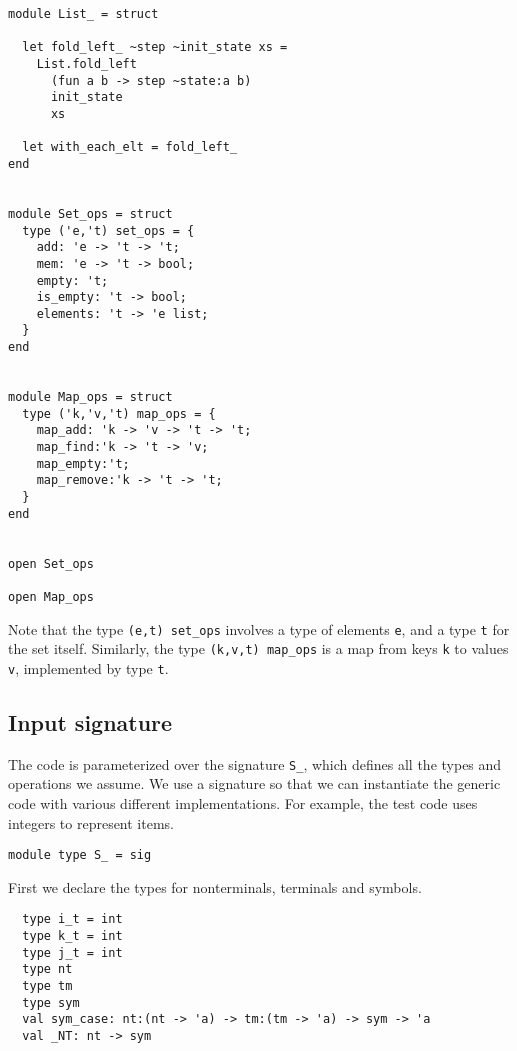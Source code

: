 \documentclass[]{article}
\begin{document}
\begin{multicols}{2}
\begin{verbatim}
module List_ = struct

  let fold_left_ ~step ~init_state xs = 
    List.fold_left 
      (fun a b -> step ~state:a b)
      init_state
      xs

  let with_each_elt = fold_left_
end


module Set_ops = struct
  type ('e,'t) set_ops = {
    add: 'e -> 't -> 't;
    mem: 'e -> 't -> bool;
    empty: 't;
    is_empty: 't -> bool;
    elements: 't -> 'e list;
  }
end


module Map_ops = struct
  type ('k,'v,'t) map_ops = {
    map_add: 'k -> 'v -> 't -> 't;
    map_find:'k -> 't -> 'v;
    map_empty:'t;
    map_remove:'k -> 't -> 't;
  }
end


open Set_ops

open Map_ops

\end{verbatim}

Note that the type
\texttt{(\textquotesingle{}e,\textquotesingle{}t) set\_ops} involves a
type of elements \texttt{\textquotesingle{}e}, and a type
\texttt{\textquotesingle{}t} for the set itself. Similarly, the type
\texttt{(\textquotesingle{}k,\textquotesingle{}v,\textquotesingle{}t) map\_ops}
is a map from keys \texttt{\textquotesingle{}k} to values
\texttt{\textquotesingle{}v}, implemented by type
\texttt{\textquotesingle{}t}.

\subsection{Input signature}

The code is parameterized over the signature \texttt{S\_}, which defines
all the types and operations we assume. We use a signature so that we
can instantiate the generic code with various different implementations.
For example, the test code uses integers to represent items.

\begin{verbatim}
module type S_ = sig  
\end{verbatim}

First we declare the types for nonterminals, terminals and symbols.

\begin{verbatim}
  type i_t = int  
  type k_t = int
  type j_t = int
  type nt
  type tm
  type sym
  val sym_case: nt:(nt -> 'a) -> tm:(tm -> 'a) -> sym -> 'a
  val _NT: nt -> sym

\end{verbatim}


\end{multicols}
\end{document}
